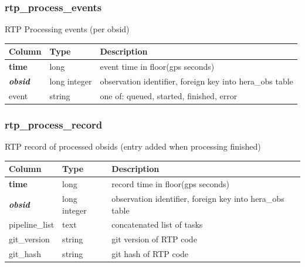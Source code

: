 \documentclass{article}
\begin{document}
{\subsubsection{rtp\_process\_events}
RTP Processing events (per obsid)
\begin{center}
 \begin{tabular}{| p{4cm} | p{2cm} | p{10cm} |}
\hline
 {\bf Column} & {\bf Type}  & {\bf Description} \\ [0.5ex]  \hline\hline
\textbf{time} & long & event time in floor(gps seconds) \\ \hline
\textit{\textbf{obsid}} & long integer & observation identifier, foreign key into hera\_obs table \\ \hline
event & string & one of: queued, started, finished, error  \\\hline
\end{tabular}
\end{center}

\subsubsection{rtp\_process\_record}
RTP record of processed obsids (entry added when processing finished)
\begin{center}
 \begin{tabular}{| p{4cm} | p{2cm} | p{10cm} |}
\hline
 {\bf Column} & {\bf Type}  & {\bf Description} \\ [0.5ex]  \hline\hline
\textbf{time} & long & record time in floor(gps seconds)\\ \hline
\textit{\textbf{obsid}} & long integer & observation identifier, foreign key into hera\_obs table \\ \hline
pipeline\_list & text & concatenated list of tasks  \\\hline
git\_version & string & git version of RTP code  \\\hline
git\_hash & string & git hash of RTP code  \\\hline
\end{tabular}
\end{center}

}
\end{document}
